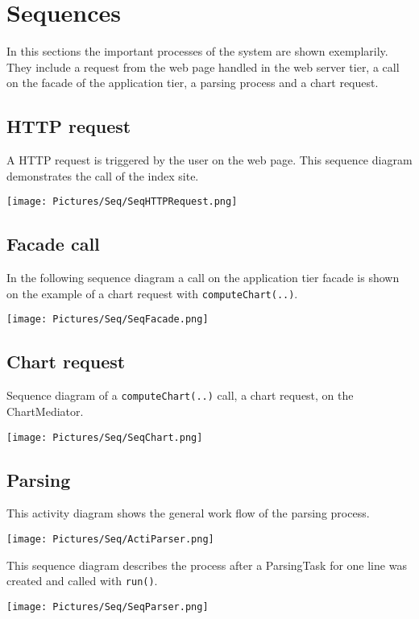 \section{Sequences}
In this sections the important processes of the system are shown exemplarily. They include a request 
from the web page handled in the web server tier, a call on the facade of the application tier,
a parsing process and a chart request.

\subsection{HTTP request}
A HTTP request is triggered by the user on the web page. This sequence diagram demonstrates
the call of the index site.

\begin{center}
\texttt{[image: Pictures/Seq/SeqHTTPRequest.png]}
\end{center}

 
\newpage 
\subsection{Facade call}
In the following sequence diagram a call on the application tier facade is shown 
on the example of a chart request with \texttt{computeChart(..)}.

\begin{center}
\texttt{[image: Pictures/Seq/SeqFacade.png]}  
\end{center} 
  


\newpage
\subsection{Chart request}
Sequence diagram of a \texttt{computeChart(..)} call, a chart request, on the ChartMediator.
 
\begin{center}
\texttt{[image: Pictures/Seq/SeqChart.png]}  
\end{center}
 
\newpage 
\subsection{Parsing} 
This activity diagram shows the general work flow of the parsing process. 
\begin{center}
\texttt{[image: Pictures/Seq/ActiParser.png]}  
\end{center}
 
\newpage
This sequence diagram describes the process after a ParsingTask for one line was created and
called with \texttt{run()}. 
\begin{center}
\texttt{[image: Pictures/Seq/SeqParser.png]}
\end{center}



    
